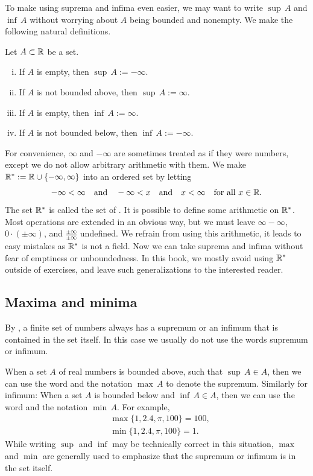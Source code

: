 To make using suprema and infima even easier, we may want to
write $\sup\, A$ and $\inf\, A$ without worrying about $A$ being
bounded and nonempty.  We make the following natural definitions.

\begin{defn}
Let $A \subset {\mathbb{R}}$ be a set.
\begin{enumerate}[(i)]
\item If $A$ is empty, then $\sup\, A := -\infty$.
\item If $A$ is not bounded above, then $\sup\, A := \infty$.
\item If $A$ is empty, then $\inf\, A := \infty$.
\item If $A$ is not bounded below, then $\inf\, A := -\infty$.
\end{enumerate}
\end{defn}

For convenience,  $\infty$ and $-\infty$ are sometimes treated as if they were
numbers, except we do not allow arbitrary arithmetic with them.
We make ${\mathbb{R}}^* := {\mathbb{R}} \cup \{ -\infty , \infty\}$
into an ordered set
by letting
\begin{equation*}
-\infty < \infty \quad \text{and} \quad
-\infty < x \quad \text{and} \quad
x < \infty \quad \text{for all $x \in {\mathbb{R}}$}.
\end{equation*}
The set ${\mathbb{R}}^*$ is called the set of \emph{}.
It is possible to define some arithmetic on ${\mathbb{R}}^*$.  Most operations
are extended in an obvious way, but we must leave
$\infty-\infty$, $0 \cdot (\pm\infty)$, and $\frac{\pm\infty}{\pm\infty}$
undefined.
We refrain from
using this arithmetic,
it leads to easy mistakes as ${\mathbb{R}}^*$ is not a field.
Now we can take suprema and infima without fear of emptiness or
unboundedness.  In this book, we mostly avoid
using ${\mathbb{R}}^*$ outside of exercises, and leave such generalizations to the interested reader.

\subsection{Maxima and minima}

By ,
a finite set of numbers always has a supremum or an infimum that is contained
in the set itself.  In this case we usually do not use the words
supremum or infimum.

When a set $A$ of real numbers is bounded above,
such that 
$\sup\, A \in A$, then we can use the word
\emph{} and the notation $\max\, A$ to denote the supremum.
Similarly for infimum: When a set $A$ is bounded below
and $\inf\, A \in A$, then we can use the
word \emph{} and the notation $\min\, A$.
For example,
\begin{align*}
& \max \{ 1,2.4,\pi,100 \} = 100 , \\
& \min \{ 1,2.4,\pi,100 \} = 1 .
\end{align*}
While writing $\sup$ and $\inf$ may be technically
correct in this situation, $\max$ and
$\min$ are generally used to emphasize that the supremum or infimum
is in the set itself.

